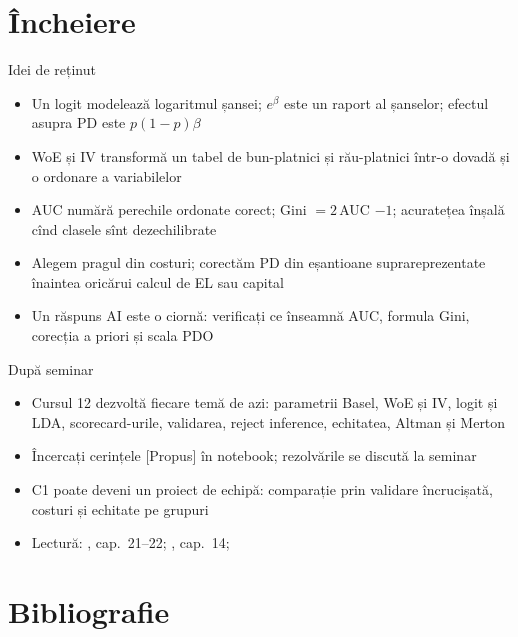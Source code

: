 \section{Încheiere}

\begin{frame}{Idei de reținut}
\itemsize{\small}
\begin{itemize}
    \item Un logit modelează logaritmul șansei; $e^{\beta}$ este un raport al șanselor; efectul asupra PD este $p(1 - p)\beta$
    \item WoE și IV transformă un tabel de bun-platnici și rău-platnici într-o dovadă și o ordonare a variabilelor
    \item AUC numără perechile ordonate corect; Gini $= 2\,$AUC $- 1$; acuratețea înșală cînd clasele sînt dezechilibrate
    \item Alegem pragul din costuri; corectăm PD din eșantioane suprareprezentate înaintea oricărui calcul de EL sau capital
    \item Un răspuns AI este o ciornă: verificați ce înseamnă AUC, formula Gini, corecția a priori și scala PDO
\end{itemize}
\end{frame}

\begin{frame}{După seminar}
\itemsize{\small}
\begin{itemize}
    \item Cursul 12 dezvoltă fiecare temă de azi: parametrii Basel, WoE și IV, logit și LDA, scorecard-urile, validarea, reject inference, echitatea, Altman și Merton
    \item Încercați cerințele [Propus] în notebook; rezolvările se discută la seminar
    \item C1 poate deveni un proiect de echipă: comparație prin validare încrucișată, costuri și echitate pe grupuri
    \item Lectură: , cap.~21--22; , cap.~14; 
\end{itemize}
\end{frame}


\section{Bibliografie}

